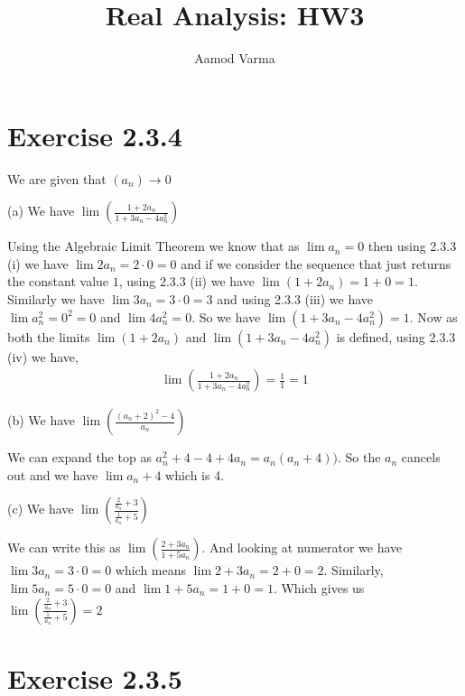 \documentclass[a4paper]{report}
\title{Real Analysis: HW3}
\author{Aamod Varma}
\begin{document}
\maketitle
\date{}
    



\section*{Exercise 2.3.4}
We are given that $(a_n) \to 0$

(a) We have $\lim \left ( \frac{1 + 2a_n}{1 + 3a_n - 4a_n^2} \right )$

\vspace{1em}

Using the Algebraic Limit Theorem  we know that as $\lim a_n = 0$ then using 2.3.3 (i) we have $\lim 2a_n = 2 \cdot 0 = 0$ and if we consider the sequence that just returns the constant value $1$, using 2.3.3 (ii) we have $\lim (1 + 2a_n) = 1 + 0 = 1$. Similarly we have $\lim 3a_n = 3 \cdot 0 = 3$ and using 2.3.3 (iii) we have $\lim a_n^2 = 0^2 = 0 $ and $\lim 4a_n^2 = 0$. So we have $\lim (1 + 3a_n - 4a_n^2) = 1$. Now as both the limits $\lim (1 + 2a_n)$ and $\lim (1 + 3a_n - 4a_n^2)$ is defined, using 2.3.3 (iv) we have,
\begin{align*}
	\lim \left ( \frac{1 + 2a_n}{1 + 3a_n - 4a_n^2} \right ) = \frac{1}{1} = 1
\end{align*}

\vspace{1em}

(b) We have $\lim \left ( \frac{(a_n + 2)^2 - 4}{a_n} \right )$

We can expand the top as $a_n^2 + 4 -4 + 4a_n = a_n( a_n + 4))$. So the $a_n$ cancels out and we have $\lim a_n + 4$ which is 4.



(c) We have $\lim \left ( \frac{\frac{2}{a_n} + 3}{\frac{1}{a_n} + 5} \right ) $


\vspace{1em}

We can write this as $\lim \left ( \frac{2 + 3a_n}{1 + 5a_n}\right)$. And looking at numerator we have $\lim 3a_n = 3 \cdot 0 = 0$ which means $\lim 2 + 3a_n = 2 + 0 = 2$. Similarly, $\lim 5a_n = 5 \cdot 0 = 0$ and $\lim 1 + 5a_n = 1 + 0 = 1$. Which gives us $\lim \left ( \frac{\frac{2}{a_n} + 3}{\frac{1}{a_n} + 5} \right )  = 2$




\section*{Exercise 2.3.5}
\end{document}
